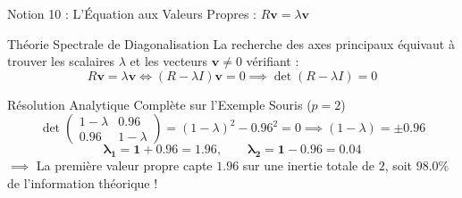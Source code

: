 \documentclass[aspectratio=169,10pt]{beamer}
\begin{document}
\begin{frame}{Notion 10 : L'Équation aux Valeurs Propres : $R \mathbf{v} = \lambda \mathbf{v}$}
  \begin{conceptbox}{Théorie Spectrale de Diagonalisation}
    \footnotesize
    La recherche des axes principaux équivaut à trouver les scalaires $\lambda$ et les vecteurs $\mathbf{v} \neq 0$ vérifiant :
    \begin{equation*}
      R \mathbf{v} = \lambda \mathbf{v} \iff (R - \lambda I) \mathbf{v} = 0 \implies \det(R - \lambda I) = 0
    \end{equation*}
  \end{conceptbox}
  \vspace{1mm}
  \begin{biobox}{Résolution Analytique Complète sur l'Exemple Souris ($p = 2$)}
    \footnotesize
    \begin{equation*}
      \det \begin{pmatrix} 1 - \lambda & 0.96 \\ 0.96 & 1 - \lambda \end{pmatrix} = (1 - \lambda)^2 - 0.96^2 = 0 \implies (1 - \lambda) = \pm 0.96
    \end{equation*}
    \begin{equation*}
      \mathbf{\lambda_1 = 1 + 0.96 = 1.96}, \qquad \mathbf{\lambda_2 = 1 - 0.96 = 0.04}
    \end{equation*}
    $\implies$ La première valeur propre capte $1.96$ sur une inertie totale de $2$, soit $\mathbf{98.0\%}$ de l'information théorique !
  \end{biobox}
\end{frame}
\end{document}
